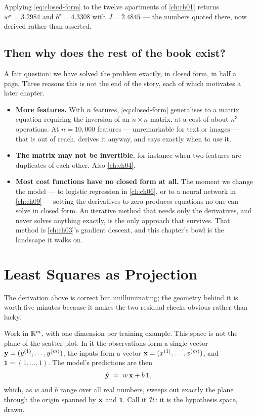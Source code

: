 Applying \cref{eq:closed-form} to the twelve apartments of \cref{ch:ch01}
returns $w^\star = 3.2984$ and $b^\star = 4.3308$ with $J = 2.4845$ --- the
numbers quoted there, now derived rather than asserted.

\subsection{Then why does the rest of the book exist?}

A fair question: we have solved the problem exactly, in closed form, in half a
page. Three reasons this is not the end of the story, each of which motivates a
later chapter.

\begin{itemize}
  \item \textbf{More features.} With $n$ features, \cref{eq:closed-form}
        generalises to a matrix equation requiring the inversion of an
        $n\times n$ matrix, at a cost of about $n^{3}$ operations. At $n =
        10{,}000$ features --- unremarkable for text or images --- that is out
        of reach.  derives it anyway, and says exactly when to use
        it.
  \item \textbf{The matrix may not be invertible}, for instance when two
        features are duplicates of each other. Also \cref{ch:ch04}.
  \item \textbf{Most cost functions have no closed form at all.} The moment we
        change the model --- to logistic regression in \cref{ch:ch06}, or to a
        neural network in \cref{ch:ch09} --- setting the derivatives to zero
        produces equations no one can solve in closed form. An iterative method
        that needs only the derivatives, and never solves anything exactly, is
        the only approach that survives. That method is \cref{ch:ch03}'s
        gradient descent, and this chapter's bowl is the landscape it walks on.
\end{itemize}

\section{Least Squares as Projection}
\label{sec:projection}

The derivation above is correct but unilluminating; the geometry behind it is
worth five minutes because it makes the two residual checks obvious rather than
lucky.

Work in $\mathbb{R}^{m}$, with one dimension per training example. This space is not
the plane of the scatter plot. In it the observations form a single
vector $\mathbf{y} = (y^{(1)},\dots,y^{(m)})$, the inputs form a vector
$\mathbf{x} = (x^{(1)},\dots,x^{(m)})$, and $\mathbf{1} = (1,\dots,1)$. The model's
predictions are then
\[
  \hat{\mathbf{y}} \;=\; w\,\mathbf{x} + b\,\mathbf{1},
\]
which, as $w$ and $b$ range over all real numbers, sweeps out exactly the plane
through the origin spanned by $\mathbf{x}$ and $\mathbf{1}$. Call it $\mathcal{H}$: it is
the hypothesis space, drawn.

